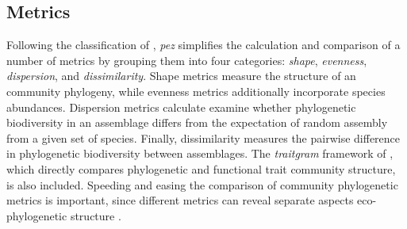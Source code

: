 \documentclass{bioinfo}
\begin{document}
\subsection{Metrics}
Following the classification of \citet{Pearse2014review}, \emph{pez}
simplifies the calculation and comparison of a number of metrics by
grouping them into four categories: \emph{shape}, \emph{evenness},
\emph{dispersion}, and \emph{dissimilarity}. Shape metrics measure the
structure of an community phylogeny, while evenness metrics
additionally incorporate species abundances. Dispersion metrics
calculate examine whether phylogenetic biodiversity in an assemblage
differs from the expectation of random assembly from a given set of
species. Finally, dissimilarity measures the pairwise difference in
phylogenetic biodiversity between assemblages. The \emph{traitgram}
framework of \citet{Cadotte2013}, which directly compares phylogenetic
and functional trait community structure, is also included. Speeding
and easing the comparison of community phylogenetic metrics is
important, since different metrics can reveal separate aspects
eco-phylogenetic structure \citep{Cadotte2010}.
\end{document}
